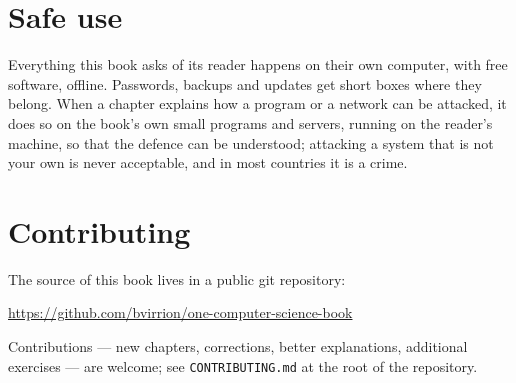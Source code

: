 \section*{Safe use}

Everything this book asks of its reader happens on their own computer, with
free software, offline. Passwords, backups and updates get short boxes where
they belong. When a chapter explains how a program or a network can be
attacked, it does so on the book's own small programs and servers, running
on the reader's machine, so that the defence can be understood; attacking a
system that is not your own is never acceptable, and in most countries it is
a crime.

\section*{Contributing}

The source of this book lives in a public git repository:
\begin{center}
\url{https://github.com/bvirrion/one-computer-science-book}
\end{center}
Contributions --- new chapters, corrections, better explanations,
additional exercises --- are welcome; see \texttt{CONTRIBUTING.md} at the
root of the repository.

